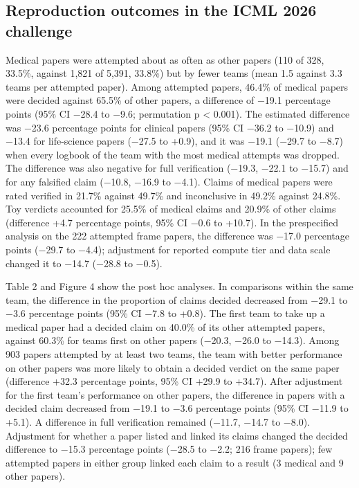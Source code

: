 \documentclass[11pt]{article}
\begin{document}
\subsection*{Reproduction outcomes in the ICML 2026 challenge}
Medical papers were attempted about as often as other papers (110 of 328, 33.5\%, against 1,821 of 5,391, 33.8\%) but by fewer teams (mean 1.5 against 3.3 teams per attempted paper). Among attempted papers, 46.4\% of medical papers were decided against 65.5\% of other papers, a difference of −19.1 percentage points (95\% CI −28.4 to −9.6; permutation p < 0.001). The estimated difference was −23.6 percentage points for clinical papers (95\% CI −36.2 to −10.9) and −13.4 for life-science papers (−27.5 to +0.9), and it was −19.1 (−29.7 to −8.7) when every logbook of the team with the most medical attempts was dropped. The difference was also negative for full verification (−19.3, −22.1 to −15.7) and for any falsified claim (−10.8, −16.9 to −4.1). Claims of medical papers were rated verified in 21.7\% against 49.7\% and inconclusive in 49.2\% against 24.8\%. Toy verdicts accounted for 25.5\% of medical claims and 20.9\% of other claims (difference +4.7 percentage points, 95\% CI −0.6 to +10.7). In the prespecified analysis on the 222 attempted frame papers, the difference was −17.0 percentage points (−29.7 to −4.4); adjustment for reported compute tier and data scale changed it to −14.7 (−28.8 to −0.5).

Table 2 and Figure 4 show the post hoc analyses. In comparisons within the same team, the difference in the proportion of claims decided decreased from −29.1 to −3.6 percentage points (95\% CI −7.8 to +0.8). The first team to take up a medical paper had a decided claim on 40.0\% of its other attempted papers, against 60.3\% for teams first on other papers (−20.3, −26.0 to −14.3). Among 903 papers attempted by at least two teams, the team with better performance on other papers was more likely to obtain a decided verdict on the same paper (difference +32.3 percentage points, 95\% CI +29.9 to +34.7). After adjustment for the first team's performance on other papers, the difference in papers with a decided claim decreased from −19.1 to −3.6 percentage points (95\% CI −11.9 to +5.1). A difference in full verification remained (−11.7, −14.7 to −8.0). Adjustment for whether a paper listed and linked its claims changed the decided difference to −15.3 percentage points (−28.5 to −2.2; 216 frame papers); few attempted papers in either group linked each claim to a result (3 medical and 9 other papers).
\end{document}
